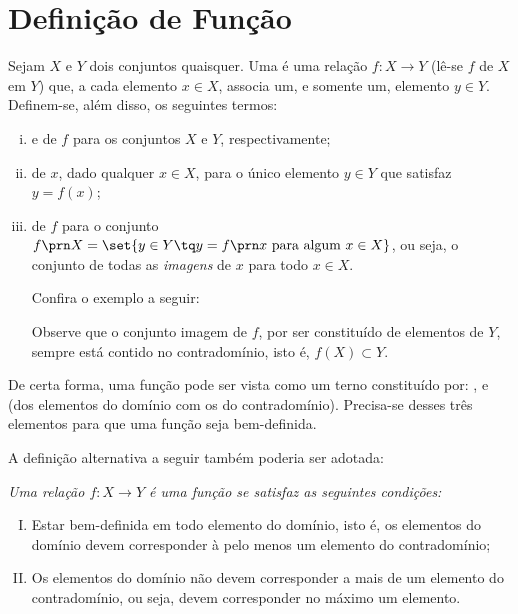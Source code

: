 \section{Definição de Função}

\begin{definition}
Sejam $X$ e $Y$ dois conjuntos quaisquer.
Uma  é uma relação $f: X \to Y$ (lê-se $f$ de $X$ em $Y$) que, a cada elemento $x \in X$, associa um, e somente um, elemento $y \in Y$.
Definem-se, além disso, os seguintes termos:
%
\begin{enumerate}[(i)]
\item {} e  de $f$ para os conjuntos $X$ e $Y$, respectivamente;
\item {} de $x$, dado qualquer $x \in X$, para o único elemento $y \in Y$ que satisfaz $y = f(x)$;
\item {} de $f$ para o conjunto $f\prn X = \set{y \in Y \tq y = f \prn x \text{ para algum } x \in X }$, ou seja, o conjunto de todas as \emph{imagens} de $x$ para todo $x \in X$.

Confira o exemplo a seguir:
\begin{center}
    
\end{center}
Observe que o conjunto imagem de $f$, por ser constituído de elementos de $Y$, sempre está contido no contradomínio, isto é, $f(X) \subset Y$.
\end{enumerate}
\end{definition}

De certa forma, uma função pode ser vista como um terno constituído por: ,  e  (dos elementos do domínio com os do contradomínio). 
Precisa-se desses três elementos para que uma função seja bem-definida. 

A definição alternativa a seguir também poderia ser adotada:
{\it \label{def:funcao-alternativa} Uma relação $f: X \to Y$ é uma \emph {função} se satisfaz as seguintes condições:
%
\begin{enumerate}[(I)]
  \item Estar bem-definida em todo elemento do domínio, isto é, os elementos do domínio devem corresponder à pelo menos um elemento do contradomínio;
  \item Os elementos do domínio não devem corresponder a mais de um elemento do contradomínio, ou seja, devem corresponder no máximo um elemento.
\end{enumerate}}


